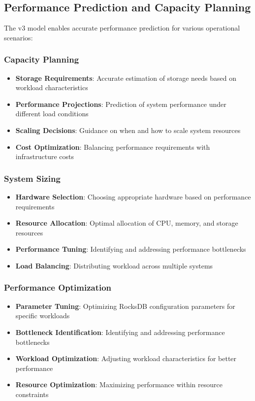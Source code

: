 \documentclass[11pt]{article}
\begin{document}
\subsection{Performance Prediction and Capacity Planning}

The v3 model enables accurate performance prediction for various operational scenarios:

\subsubsection{Capacity Planning}
\begin{itemize}
    \item \textbf{Storage Requirements}: Accurate estimation of storage needs based on workload characteristics
    \item \textbf{Performance Projections}: Prediction of system performance under different load conditions
    \item \textbf{Scaling Decisions}: Guidance on when and how to scale system resources
    \item \textbf{Cost Optimization}: Balancing performance requirements with infrastructure costs
\end{itemize}

\subsubsection{System Sizing}
\begin{itemize}
    \item \textbf{Hardware Selection}: Choosing appropriate hardware based on performance requirements
    \item \textbf{Resource Allocation}: Optimal allocation of CPU, memory, and storage resources
    \item \textbf{Performance Tuning}: Identifying and addressing performance bottlenecks
    \item \textbf{Load Balancing}: Distributing workload across multiple systems
\end{itemize}

\subsubsection{Performance Optimization}
\begin{itemize}
    \item \textbf{Parameter Tuning}: Optimizing RocksDB configuration parameters for specific workloads
    \item \textbf{Bottleneck Identification}: Identifying and addressing performance bottlenecks
    \item \textbf{Workload Optimization}: Adjusting workload characteristics for better performance
    \item \textbf{Resource Optimization}: Maximizing performance within resource constraints
\end{itemize}
\end{document}

